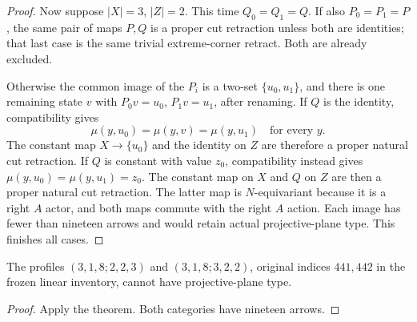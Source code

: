 \begin{proof}
Now suppose $|X|=3$, $|Z|=2$.  This time
$Q_0=Q_1=Q$.  If also $P_0=P_1=P$, the same pair of
maps $P,Q$ is a proper cut retraction unless both are
identities; that last case is the same trivial
extreme-corner retract.  Both are already excluded.

Otherwise the common image of the $P_i$ is a two-set
$\{u_0,u_1\}$, and there is one remaining state $v$
with $P_0v=u_0$, $P_1v=u_1$, after renaming.
If $Q$ is the identity, compatibility gives
\[
 \mu(y,u_0)=\mu(y,v)=\mu(y,u_1)
 \quad\text{for every }y.
\]
The constant map $X\to\{u_0\}$ and the identity on
$Z$ are therefore a proper natural cut retraction.
If $Q$ is constant with value $z_0$, compatibility
instead gives
$\mu(y,u_0)=\mu(y,u_1)=z_0$.
The constant map on $X$ and $Q$ on $Z$ are then a
proper natural cut retraction.  The latter map is
$N$-equivariant because it is a right $A$ actor,
and both maps commute with the right $A$ action.
Each image has fewer than nineteen arrows and would
retain actual projective-plane type.  This finishes
all cases.
\end{proof}

\begin{corollary}
\label{CP2:A-linear19-three-initial-large-profiles}
The profiles $(3,1,8;2,2,3)$ and $(3,1,8;3,2,2)$,
original indices $441,442$ in the frozen linear
inventory, cannot have projective-plane type.
\end{corollary}
\begin{proof}
Apply the theorem.  Both categories have nineteen arrows.
\end{proof}
